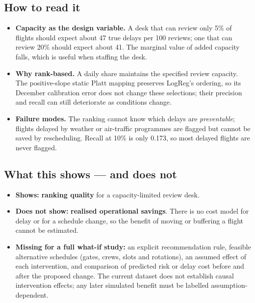 \documentclass[conference]{IEEEtran}
\newcommand{\tabsize}{\footnotesize}
\begin{document}
\begin{table}[!t]
\caption[Daily review-candidate ranking.]{Rescheduling-candidate analysis on the test window: daily top-$k\%$ by risk.}
\label{tab:resched}
\centering\tabsize

\end{table}

\subsection{How to read it}
\begin{itemize}
\item \textbf{Capacity as the design variable.} A desk that can review only 5\% of flights should expect about 47 true delays per 100 reviews; one that can review 20\% should expect about 41. The marginal value of added capacity falls, which is useful when staffing the desk.
\item \textbf{Why rank-based.} A daily share maintains the specified review capacity. The positive-slope static Platt mapping preserves LogReg's ordering, so its December calibration error does not change these selections; their precision and recall can still deteriorate as conditions change.
\item \textbf{Failure modes.} The ranking cannot know which delays are \emph{preventable}; flights delayed by weather or air-traffic programmes are flagged but cannot be saved by rescheduling. Recall at 10\% is only 0.173, so most delayed flights are never flagged.
\end{itemize}

\subsection{What this shows --- and does not}
\begin{itemize}
\item \textbf{Shows:} \textbf{ranking quality} for a capacity-limited review desk.
\item \textbf{Does not show:} \textbf{realised operational savings}. There is no cost model for delay or for a schedule change, so the benefit of moving or buffering a flight cannot be estimated.
\item \textbf{Missing for a full what-if study:} an explicit recommendation rule, feasible alternative schedules (gates, crews, slots and rotations), an assumed effect of each intervention, and comparison of predicted risk or delay cost before and after the proposed change. The current dataset does not establish causal intervention effects; any later simulated benefit must be labelled assumption-dependent.
\end{itemize}
\end{document}
